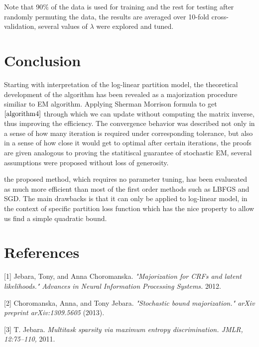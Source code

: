 \documentclass{article}
\begin{document}
Note that 90$\%$ of the data is used for training and the rest for testing after randomly permuting the data,  
the results are averaged over 10-fold cross-validation, several values of $\lambda$ were explored and tuned.


\section{Conclusion}

Starting with interpretation of the log-linear partition model, the theoretical development of the algorithm has been revealed as a majorization procedure similiar to EM algorithm. Applying Sherman Morrison formula to 
 get $\ref{algorithm4}$ through which we can update without computing the matrix inverse, thus improving the efficiency.
 The convergence behavior was described not only in a sense of how many iteration is required under corresponding tolerance, but also in a sense of how close it would get to optimal after certain iterations,
 the proofs are given analogous to proving the statitiscal guarantee of stochastic EM, several assumptions were proposed without loss of generosity. 

 the proposed method, which requires no parameter tuning, has been evalueated as much more efficient than most of the first order methods such as LBFGS and SGD. The main drawbacks is that 
 it can only be applied to log-linear model, in the context of specific partition loss function which has the nice property to allow us find a simple quadratic bound. 







\section*{References}

\small

[1] Jebara, Tony, and Anna Choromanska. {\it"Majorization for CRFs and latent likelihoods."}
 {\it Advances in Neural Information Processing Systems.} 2012.

[2] Choromanska, Anna, and Tony Jebara. {\it"Stochastic bound majorization." arXiv preprint arXiv:1309.5605} (2013).

[3] T. Jebara. {\it Multitask sparsity via maximum entropy discrimination. JMLR, 12:75–110,} 2011.
\end{document}
